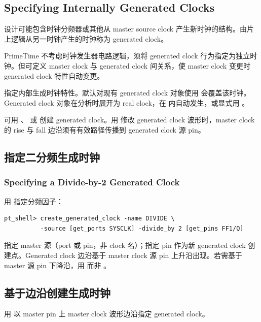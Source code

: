 \subsection*{Specifying Internally Generated Clocks}

设计可能包含时钟分频器或其他从 master source clock 产生新时钟的结构。由片上逻辑从另一时钟产生的时钟称为 generated clock。


PrimeTime 不考虑时钟发生器电路逻辑，须将 generated clock 行为指定为独立时钟。但可定义 master clock 与 generated clock 间关系，使 master clock 变更时 generated clock 特性自动变更。

 指定内部生成时钟特性。默认对现有 generated clock 对象使用  会覆盖该时钟。Generated clock 对象在分析时展开为 real clock，在  内自动发生，或显式用 。

可用 、 或  创建 generated clock。用  修改 generated clock 波形时，master clock 的 rise 与 fall 边沿须有有效路径传播到 generated clock 源 pin。

\subsection{指定二分频生成时钟}
\subsubsection*{Specifying a Divide-by-2 Generated Clock}

用  指定分频因子：
\begin{lstlisting}
pt_shell> create_generated_clock -name DIVIDE \
          -source [get_ports SYSCLK] -divide_by 2 [get_pins FF1/Q]
\end{lstlisting}

 指定 master 源（port 或 pin，非 clock 名）；指定 pin 作为新 generated clock 创建点。Generated clock 边沿基于 master clock 源 pin 上升沿出现。若需基于 master 源 pin 下降沿，用  而非 。

\subsection{基于边沿创建生成时钟}
用  以 master pin 上 master clock 波形边沿指定 generated clock。

